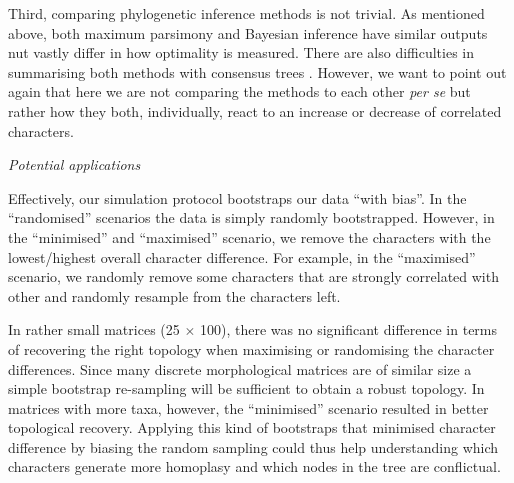 \documentclass[12pt,letterpaper]{article}
\renewcommand{\subsection}[1]{%
\bigskip
\begin{center}
\begin{large}
\normalfont\itshape #1
\end{large}
\end{center}}
\begin{document}
Third, comparing phylogenetic inference methods is not trivial.
As mentioned above, both maximum parsimony and Bayesian inference
have similar outputs nut vastly differ in how optimality is measured.
There are also difficulties in summarising both methods with consensus trees \cite{oReilly2017efficacy}.
However, we want to point out again that here we are not comparing the methods to each other \textit{per se} but rather how they both, individually, react to an increase or decrease of correlated characters.

\subsection{Potential applications} %
Effectively, our simulation protocol bootstraps our data ``with bias''.
In the ``randomised'' scenarios the data is simply randomly bootstrapped. %
However, in the ``minimised'' and ``maximised'' scenario, we remove the characters with the lowest/highest overall character difference.
For example, in the ``maximised'' scenario, we randomly remove some characters that are strongly correlated with other and randomly resample from the characters left.

In rather small matrices (25 $\times$ 100), there was no significant difference in terms of recovering the right topology when maximising or randomising the character differences.
Since many discrete morphological matrices are of similar size \citep{guillerme2016assessment} a simple bootstrap re-sampling
will be sufficient to obtain a robust topology.%
In matrices with more taxa, however, the ``minimised'' scenario resulted in better topological recovery.
Applying this kind of bootstraps that minimised character difference by biasing the random sampling could thus help understanding which characters generate more homoplasy and which nodes in the tree are conflictual.
\end{document}
